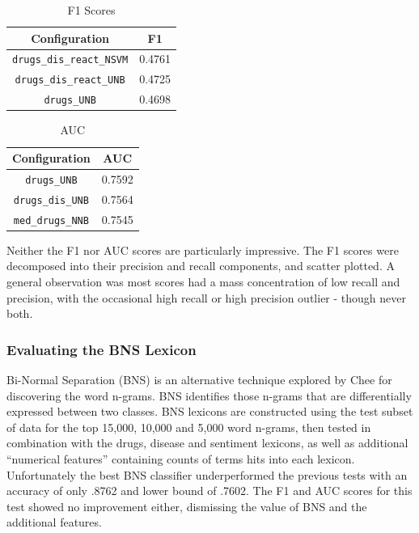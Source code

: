\documentclass[twoside,11pt]{article}
\begin{document}
\begin{minipage}{.6\textwidth}
  \begin{table}[H]
    \caption{F1 Scores}
    \label{table5}
    \begin{tabular}{||c|c||}
      \hline
      Configuration & F1 \\
      \hline\hline
      \verb|drugs_dis_react_NSVM| & 0.4761 \\
      \hline
      \verb|drugs_dis_react_UNB| & 0.4725 \\
      \hline
      \verb|drugs_UNB| & 0.4698 \\
      \hline
    \end{tabular}
  \end{table}
\end{minipage}
\begin{minipage}{.4\textwidth}
  \begin{table}[H]
    \caption{AUC}
    \label{table6}
    \begin{tabular}{||c|c||}
      \hline
      Configuration & AUC \\
      \hline\hline
      \verb|drugs_UNB| & 0.7592 \\
      \hline
      \verb|drugs_dis_UNB| & 0.7564 \\
      \hline
      \verb|med_drugs_NNB| & 0.7545 \\
      \hline
    \end{tabular}
  \end{table}
\end{minipage}


Neither the F1 nor AUC scores are particularly impressive. The F1 scores were decomposed into their precision and recall components, and scatter plotted. A general observation was most scores had a mass concentration of low recall and precision, with the occasional high recall or high precision outlier - though never both.

\subsubsection{Evaluating the BNS Lexicon}
Bi-Normal Separation (BNS) is an alternative technique explored by Chee for discovering the word n-grams. BNS identifies those n-grams that are differentially expressed between two classes. BNS lexicons are constructed using the test subset of data for the top 15,000, 10,000 and 5,000 word n-grams, then tested in combination with the drugs, disease and sentiment lexicons, as well as additional ``numerical features'' containing counts of terms hits into each lexicon. Unfortunately the best BNS classifier underperformed the previous tests with an accuracy of only .8762 and lower bound of .7602. The F1 and AUC scores for this test showed no improvement either, dismissing the value of BNS and the additional features.
\end{document}

